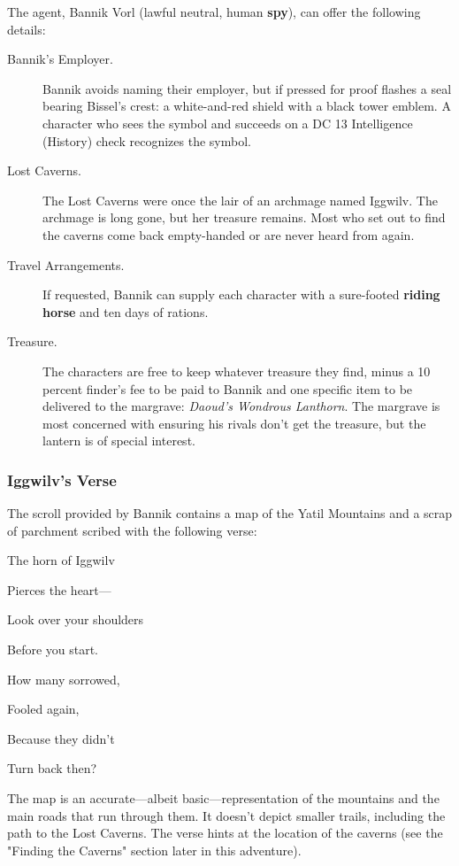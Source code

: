 \documentclass[10pt,a4paper,twoside,bg=print,twocolumn,openany,nodeprecatedcode]{dndbook}
\begin{document}
The agent, Bannik Vorl (lawful neutral, human \textbf{spy}), can offer the following details:


\begin{description}
\item[Bannik's Employer.]
Bannik avoids naming their employer, but if pressed for proof flashes a seal bearing Bissel's crest: a white-and-red shield with a black tower emblem. A character who sees the symbol and succeeds on a DC 13 Intelligence (History) check recognizes the symbol.
\item[Lost Caverns.]
The Lost Caverns were once the lair of an archmage named Iggwilv. The archmage is long gone, but her treasure remains. Most who set out to find the caverns come back empty-handed or are never heard from again.
\item[Travel Arrangements.]
If requested, Bannik can supply each character with a sure-footed \textbf{riding horse} and ten days of rations.
\item[Treasure.]
The characters are free to keep whatever treasure they find, minus a 10 percent finder's fee to be paid to Bannik and one specific item to be delivered to the margrave: \textit{Daoud's Wondrous Lanthorn}. The margrave is most concerned with ensuring his rivals don't get the treasure, but the lantern is of special interest.
\end{description}

\subsubsection{Iggwilv's Verse}
The scroll provided by Bannik contains a map of the Yatil Mountains and a scrap of parchment scribed with the following verse:

\begin{DndReadAloud}{}
The horn of Iggwilv

Pierces the heart—

Look over your shoulders

Before you start.

How many sorrowed,

Fooled again,

Because they didn't

Turn back then?

\end{DndReadAloud}

The map is an accurate—albeit basic—representation of the mountains and the main roads that run through them. It doesn't depict smaller trails, including the path to the Lost Caverns. The verse hints at the location of the caverns (see the "Finding the Caverns" section later in this adventure).
\end{document}
